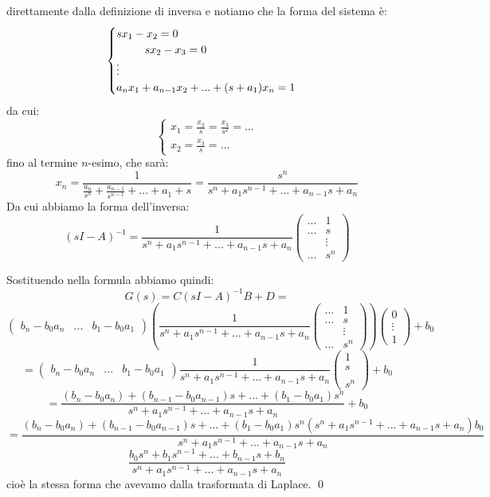 \documentclass[a4paper,11pt]{article}
\begin{document}
direttamente dalla definizione di inversa e notiamo che la forma del sistema è:
\[
	\begin{cases}
		s x_1 - x_2 = 0 \\ 
		\hspace{.9cm} sx_2 - x_3 = 0 \\
		\vdots \\
		a_n x_1 + a_{n - 1} x_2 + ... + (s + a_1) x_n = 1
	\end{cases}
\]
da cui:
\[
	\begin{cases}
		x_1 = \frac{x_2}{s} = \frac{x_3}{s^2} = ... \\ 
		x_2 = \frac{x_3}{s} = ...
	\end{cases}
\]
fino al termine $n$-esimo, che sarà:
$$
x_n = \frac{1}{\frac{a_n}{s^n} + \frac{a_{n - 1}}{s^{n - 1}} + ... + a_1 + s} = \frac{s^{n}}{s^n + a_1 s^{n - 1} + ... + a_{n - 1} s + a_n}
$$
Da cui abbiamo la forma dell'inversa:
$$
(sI - A)^{-1} = 
\frac{1}{s^n + a_1 s^{n - 1} + ... + a_{n - 1} s + a_n}
\begin{pmatrix}
	... & 1 \\ 
	... & s \\
	& \vdots \\ 
	... & s^n
\end{pmatrix}
$$

Sostituendo nella formula abbiamo quindi:
$$
G(s) = C(sI - A)^{-1} B + D = 
$$
$$
\begin{pmatrix}
	b_n - b_0 a_n & ... & b_1 - b_0 a_1	
\end{pmatrix} 
\left(
\frac{1}{s^n + a_1 s^{n - 1} + ... + a_{n - 1} s + a_n}
\begin{pmatrix}
	... & 1 \\ 
	... & s \\
	& \vdots \\ 
	... & s^n
\end{pmatrix}
\right)
\begin{pmatrix}
	0 \\ \vdots \\ 1
\end{pmatrix}
+ b_0
$$
$$
= \begin{pmatrix}
	b_n - b_0 a_n & ... & b_1 - b_0 a_1	
\end{pmatrix} 
\frac{1}{s^n + a_1 s^{n - 1} + ... + a_{n - 1} s + a_n}
\begin{pmatrix}
	 1 \\ 
	 s \\
	 \\ 
	 s^n
\end{pmatrix}
+ b_0
$$
$$
= \frac{ (b_n - b_0 a_n) + (b_{n - 1} - b_0 a_{n - 1}) s + ... + (b_1 - b_0 a_1)s^n }{ s^n + a_1 s^{n - 1} + ... + a_{n - 1} s + a_n} + b_0
$$
$$
= \frac{ (b_n - b_0 a_n) + (b_{n - 1} - b_0 a_{n - 1}) s + ... + (b_1 - b_0 a_1)s^n (s^n + a_1 s^{n - 1} + ... + a_{n - 1} s + a_n) b_0}{ s^n + a_1 s^{n - 1} + ... + a_{n - 1} s + a_n}
$$
$$
\frac{ b_0 s^n + b_1 s^{n - 1} + ... + b_{n - 1} s + b_n}{s^n + a_1 s^{n - 1} + ... + a_{n - 1} s + a_n }
$$
cioè la stessa forma che avevamo dalla trasformata di Laplace. \qed
\end{document}
